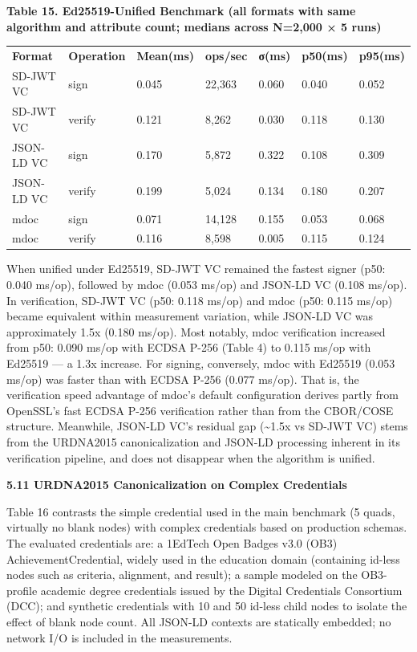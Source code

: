 \textbf{Table 15. Ed25519-Unified Benchmark (all formats with same algorithm and attribute count; medians across N=2,000 × 5 runs)}

\begin{longtable}[]{@{}lllllll@{}}
\toprule
\endhead
\textbf{Format} & \textbf{Operation} & \textbf{Mean(ms)} & \textbf{ops/sec} & \textbf{σ(ms)} & \textbf{p50(ms)} & \textbf{p95(ms)}\tabularnewline
SD-JWT VC & sign & 0.045 & 22,363 & 0.060 & 0.040 & 0.052\tabularnewline
SD-JWT VC & verify & 0.121 & 8,262 & 0.030 & 0.118 & 0.130\tabularnewline
JSON-LD VC & sign & 0.170 & 5,872 & 0.322 & 0.108 & 0.309\tabularnewline
JSON-LD VC & verify & 0.199 & 5,024 & 0.134 & 0.180 & 0.207\tabularnewline
mdoc & sign & 0.071 & 14,128 & 0.155 & 0.053 & 0.068\tabularnewline
mdoc & verify & 0.116 & 8,598 & 0.005 & 0.115 & 0.124\tabularnewline
\bottomrule
\end{longtable}

When unified under Ed25519, SD-JWT VC remained the fastest signer (p50: 0.040 ms/op), followed by mdoc (0.053 ms/op) and JSON-LD VC (0.108 ms/op). In verification, SD-JWT VC (p50: 0.118 ms/op) and mdoc (p50: 0.115 ms/op) became equivalent within measurement variation, while JSON-LD VC was approximately 1.5x (0.180 ms/op). Most notably, mdoc verification increased from p50: 0.090 ms/op with ECDSA P-256 (Table 4) to 0.115 ms/op with Ed25519 --- a 1.3x increase. For signing, conversely, mdoc with Ed25519 (0.053 ms/op) was faster than with ECDSA P-256 (0.077 ms/op). That is, the verification speed advantage of mdoc's default configuration derives partly from OpenSSL's fast ECDSA P-256 verification rather than from the CBOR/COSE structure. Meanwhile, JSON-LD VC's residual gap (\textasciitilde1.5x vs SD-JWT VC) stems from the URDNA2015 canonicalization and JSON-LD processing inherent in its verification pipeline, and does not disappear when the algorithm is unified.

\textbf{5.11 URDNA2015 Canonicalization on Complex Credentials}

Table 16 contrasts the simple credential used in the main benchmark (5 quads, virtually no blank nodes) with complex credentials based on production schemas. The evaluated credentials are: a 1EdTech Open Badges v3.0 (OB3) AchievementCredential, widely used in the education domain (containing id-less nodes such as criteria, alignment, and result); a sample modeled on the OB3-profile academic degree credentials issued by the Digital Credentials Consortium (DCC); and synthetic credentials with 10 and 50 id-less child nodes to isolate the effect of blank node count. All JSON-LD contexts are statically embedded; no network I/O is included in the measurements.

